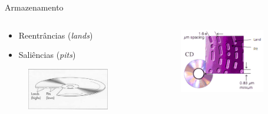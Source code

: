 \documentclass[aspectratio=169,
				xcolor=table]{beamer}
\begin{document}
	\begin{frame}{Armazenamento}
		\begin{columns}
			\begin{column}{0.5\textwidth}
				\begin{itemize}
					\item Reentrâncias (\textit{lands}) 
					\item Saliências (\textit{pits})
				\end{itemize}
				\begin{figure}[hbtp]
				\centering
				\includegraphics[width=0.85\textwidth, keepaspectratio]{../figs/cap08/landpit}
				\end{figure}				
			\end{column}
			\begin{column}{0.5\textwidth}
				\begin{figure}[hbtp]
				\centering
				\includegraphics[width=0.85\textwidth, keepaspectratio]{../figs/cap08/landpit2}
				\end{figure}
			\end{column}
		\end{columns}

	\end{frame}
	
\end{document}
